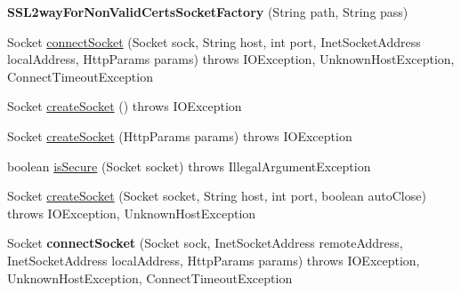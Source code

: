 \begin{DoxyCompactItemize}
\item 
\hypertarget{classcom_1_1bluevia_1_1commons_1_1connector_1_1http_1_1SSL2wayForNonValidCertsSocketFactory_a0ee435899f8fb4de7664fd67ca63d778}{
{\bfseries SSL2wayForNonValidCertsSocketFactory} (String path, String pass)}
\label{classcom_1_1bluevia_1_1commons_1_1connector_1_1http_1_1SSL2wayForNonValidCertsSocketFactory_a0ee435899f8fb4de7664fd67ca63d778}

\item 
Socket \hyperlink{classcom_1_1bluevia_1_1commons_1_1connector_1_1http_1_1SSL2wayForNonValidCertsSocketFactory_af06c0cc98a3bc78b0f18d558df35a28c}{connectSocket} (Socket sock, String host, int port, InetSocketAddress localAddress, HttpParams params)  throws IOException, UnknownHostException,             ConnectTimeoutException 
\item 
Socket \hyperlink{classcom_1_1bluevia_1_1commons_1_1connector_1_1http_1_1SSL2wayForNonValidCertsSocketFactory_a125620c3da8bae5cbd41c3ce90382415}{createSocket} ()  throws IOException 
\item 
Socket \hyperlink{classcom_1_1bluevia_1_1commons_1_1connector_1_1http_1_1SSL2wayForNonValidCertsSocketFactory_a7773188423bfc19979785635dc638b4d}{createSocket} (HttpParams params)  throws IOException 
\item 
boolean \hyperlink{classcom_1_1bluevia_1_1commons_1_1connector_1_1http_1_1SSL2wayForNonValidCertsSocketFactory_a080bcca6b6b5fc8a064c7947cc2efc84}{isSecure} (Socket socket)  throws IllegalArgumentException 
\item 
Socket \hyperlink{classcom_1_1bluevia_1_1commons_1_1connector_1_1http_1_1SSL2wayForNonValidCertsSocketFactory_ab4ba61e6bb73afaa7839d5390a2c08bc}{createSocket} (Socket socket, String host, int port, boolean autoClose)  throws IOException, UnknownHostException 
\item 
\hypertarget{classcom_1_1bluevia_1_1commons_1_1connector_1_1http_1_1SSL2wayForNonValidCertsSocketFactory_ab804f0bc5d94e6aba368dce22f32dd6c}{
Socket {\bfseries connectSocket} (Socket sock, InetSocketAddress remoteAddress, InetSocketAddress localAddress, HttpParams params)  throws IOException, UnknownHostException, ConnectTimeoutException }
\label{classcom_1_1bluevia_1_1commons_1_1connector_1_1http_1_1SSL2wayForNonValidCertsSocketFactory_ab804f0bc5d94e6aba368dce22f32dd6c}


\end{DoxyCompactItemize}
